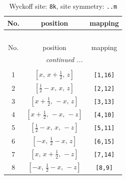 \documentclass[fleqn,8pt]{jsarticle}
\begin{document}
\begin{longtable}{ccc}
\caption{Wyckoff site: {\tt 8k}, site symmetry: {\tt ..m}}
 \\
 \hline \hline
No. & position & mapping \\ \hline \endfirsthead

\multicolumn{2}{l}{\tablename\ \thetable{}} \\
 \hline \hline
No. & position & mapping \\ \hline \endhead

 \hline \hline
\multicolumn{2}{r}{\footnotesize\it continued ...} \\ \endfoot

 \hline \hline
\multicolumn{2}{r}{} \\ \endlastfoot

1 & $\left[ x,\, x + \frac{1}{2},\, z \right]$ & {\tt [1,16]} \\ \hline
2 & $\left[ \frac{1}{2} - x,\, x,\, z \right]$ & {\tt [2,12]} \\ \hline
3 & $\left[ x + \frac{1}{2},\, - x,\, z \right]$ & {\tt [3,13]} \\ \hline
4 & $\left[ x + \frac{1}{2},\, - x,\, - z \right]$ & {\tt [4,10]} \\ \hline
5 & $\left[ \frac{1}{2} - x,\, x,\, - z \right]$ & {\tt [5,11]} \\ \hline
6 & $\left[ - x,\, \frac{1}{2} - x,\, z \right]$ & {\tt [6,15]} \\ \hline
7 & $\left[ x,\, x + \frac{1}{2},\, - z \right]$ & {\tt [7,14]} \\ \hline
8 & $\left[ - x,\, \frac{1}{2} - x,\, - z \right]$ & {\tt [8,9]} \\
\end{longtable}
\renewcommand{\arraystretch}{1.2}
\end{document}
